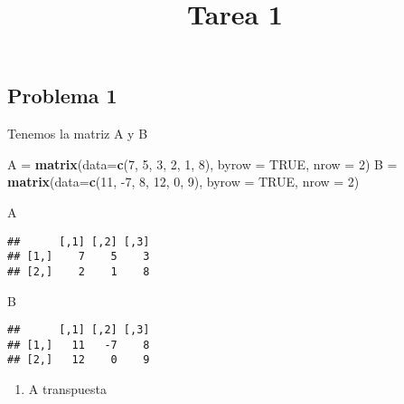 \documentclass[
]{article}
\title{Tarea 1}
\author{}
\date{\vspace{-2.5em}}
\newenvironment{Shaded}{\begin{snugshade}}{\end{snugshade}}
\newcommand{\DataTypeTok}[1]{\textcolor[rgb]{0.13,0.29,0.53}{#1}}
\newcommand{\DecValTok}[1]{\textcolor[rgb]{0.00,0.00,0.81}{#1}}
\newcommand{\KeywordTok}[1]{\textcolor[rgb]{0.13,0.29,0.53}{\textbf{#1}}}
\newcommand{\NormalTok}[1]{#1}
\newcommand{\OtherTok}[1]{\textcolor[rgb]{0.56,0.35,0.01}{#1}}
\newcommand{\StringTok}[1]{\textcolor[rgb]{0.31,0.60,0.02}{#1}}
\providecommand{\tightlist}{%
  \setlength{\itemsep}{0pt}\setlength{\parskip}{0pt}}
\begin{document}
\maketitle

\hypertarget{problema-1}{%
\subsection{Problema 1}\label{problema-1}}

Tenemos la matriz A y B

\begin{Shaded}
\begin{Highlighting}[]
\NormalTok{A =}\StringTok{ }\KeywordTok{matrix}\NormalTok{(}\DataTypeTok{data=}\KeywordTok{c}\NormalTok{(}\DecValTok{7}\NormalTok{, }\DecValTok{5}\NormalTok{, }\DecValTok{3}\NormalTok{, }\DecValTok{2}\NormalTok{, }\DecValTok{1}\NormalTok{, }\DecValTok{8}\NormalTok{), }\DataTypeTok{byrow =} \OtherTok{TRUE}\NormalTok{, }\DataTypeTok{nrow =} \DecValTok{2}\NormalTok{)}
\NormalTok{B =}\StringTok{ }\KeywordTok{matrix}\NormalTok{(}\DataTypeTok{data=}\KeywordTok{c}\NormalTok{(}\DecValTok{11}\NormalTok{, }\DecValTok{-7}\NormalTok{, }\DecValTok{8}\NormalTok{, }\DecValTok{12}\NormalTok{, }\DecValTok{0}\NormalTok{, }\DecValTok{9}\NormalTok{), }\DataTypeTok{byrow =} \OtherTok{TRUE}\NormalTok{, }\DataTypeTok{nrow =} \DecValTok{2}\NormalTok{)}
\end{Highlighting}
\end{Shaded}

\begin{Shaded}
\begin{Highlighting}[]
\NormalTok{A}
\end{Highlighting}
\end{Shaded}

\begin{verbatim}
##      [,1] [,2] [,3]
## [1,]    7    5    3
## [2,]    2    1    8
\end{verbatim}

\begin{Shaded}
\begin{Highlighting}[]
\NormalTok{B}
\end{Highlighting}
\end{Shaded}

\begin{verbatim}
##      [,1] [,2] [,3]
## [1,]   11   -7    8
## [2,]   12    0    9
\end{verbatim}

\begin{enumerate}
\def\labelenumi{\alph{enumi})}
\tightlist
\item
  A transpuesta
\end{enumerate}
\end{document}
